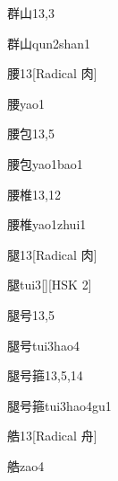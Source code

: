 \begin{entry}{群山}{13,3}
  \begin{phonetics}{群山}{qun2shan1}
  \end{phonetics}
\end{entry}

\begin{entry}{腰}{13}[Radical 肉]
  \begin{phonetics}{腰}{yao1}
  \end{phonetics}
\end{entry}

\begin{entry}{腰包}{13,5}
  \begin{phonetics}{腰包}{yao1bao1}
  \end{phonetics}
\end{entry}

\begin{entry}{腰椎}{13,12}
  \begin{phonetics}{腰椎}{yao1zhui1}
  \end{phonetics}
\end{entry}

\begin{entry}{腿}{13}[Radical 肉]
  \begin{phonetics}{腿}{tui3}[][HSK 2]
  \end{phonetics}
\end{entry}

\begin{entry}{腿号}{13,5}
  \begin{phonetics}{腿号}{tui3hao4}
  \end{phonetics}
\end{entry}

\begin{entry}{腿号箍}{13,5,14}
  \begin{phonetics}{腿号箍}{tui3hao4gu1}
  \end{phonetics}
\end{entry}

\begin{entry}{艁}{13}[Radical 舟]
  \begin{phonetics}{艁}{zao4}
  \end{phonetics}
\end{entry}

